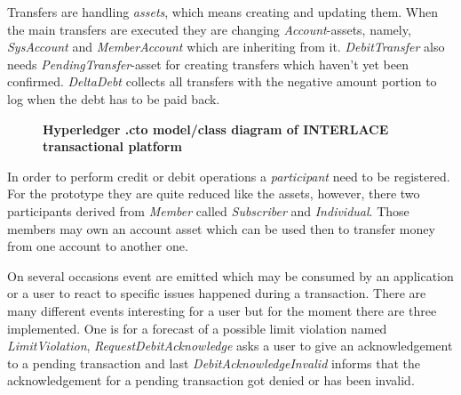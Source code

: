 Transfers are handling \textit{assets}, which means creating and updating them. When the main transfers are executed they are changing \textit{Account}-assets, namely, \textit{SysAccount} and \textit{MemberAccount} which are inheriting from it. \textit{DebitTransfer} also needs \textit{PendingTransfer}-asset for creating transfers which haven't yet been confirmed. \textit{DeltaDebt} collects all transfers with the negative amount portion to log when the debt has to be paid back.


\begin{figure}[h]
\centering
{}
\caption{\bf \small Hyperledger .cto model/class diagram of INTERLACE transactional platform}
\label{fig:DCN-cto}
\end{figure}

In order to perform credit or debit operations a \textit{participant} need to be registered. For the prototype they are quite reduced like the assets, however, there two participants derived from \textit{Member} called \textit{Subscriber} and \textit{Individual}. Those members may own an account asset which can be used then to transfer money from one account to another one.

On several occasions event are emitted which may be consumed by an application or a user to react to specific issues happened during a transaction. There are many different events interesting for a user but for the moment there are three implemented. One is for a forecast of a possible limit violation named \textit{LimitViolation}, \textit{RequestDebitAcknowledge} asks a user to give an acknowledgement to a pending transaction and last \textit{DebitAcknowledgeInvalid} informs that the acknowledgement for a pending transaction got denied or has been invalid.

